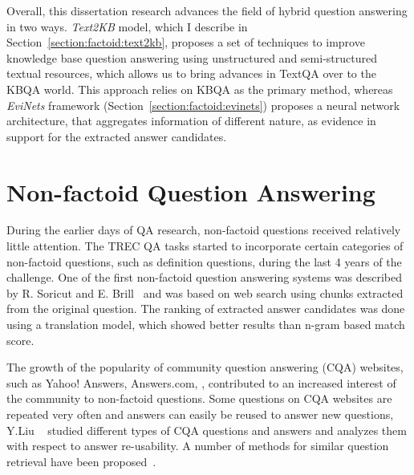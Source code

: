 Overall, this dissertation research advances the field of hybrid question answering in two ways.
\textit{Text2KB} model, which I describe in Section~\ref{section:factoid:text2kb}, proposes a set of techniques to improve knowledge base question answering using unstructured and semi-structured textual resources, which allows us to bring advances in TextQA over to the KBQA world.
This approach relies on KBQA as the primary method, whereas \textit{EviNets} framework (Section~\ref{section:factoid:evinets}) proposes a neural network architecture, that aggregates information of different nature, as evidence in support for the extracted answer candidates.

\section{Non-factoid Question Answering}
\label{section:relatedwork:non-factoid}

During the earlier days of QA research, non-factoid questions received relatively little attention.
The TREC QA tasks started to incorporate certain categories of non-factoid questions, such as definition questions, during the last 4 years of the challenge.
One of the first non-factoid question answering systems was described by R. Soricut and E. Brill~\cite{soricut2006automatic} and was based on web search using chunks extracted from the original question.
The ranking of extracted answer candidates was done using a translation model, which showed better results than n-gram based match score.

The growth of the popularity of community question answering (CQA) websites, such as Yahoo! Answers, Answers.com, \etc, contributed to an increased interest of the community to non-factoid questions.
Some questions on CQA websites are repeated very often and answers can easily be reused to answer new questions, Y.Liu \etal~\cite{Liu:2008:USA:1599081.1599144} studied different types of CQA questions and answers and analyzes them with respect to answer re-usability.
A number of methods for similar question retrieval have been proposed~\cite{bernhard2009combining,duan2008searching,Jeon:2005:FSQ:1099554.1099572,Shtok:2012:LPA:2187836.2187939}.

